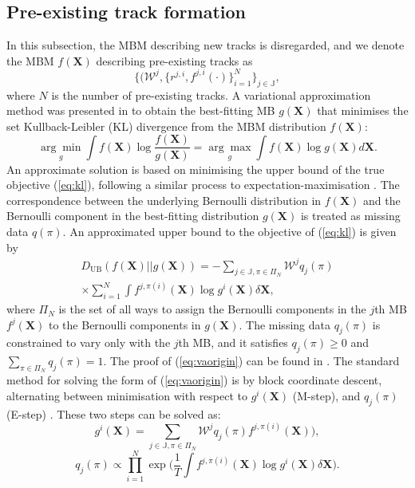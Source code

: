 \documentclass[conference]{IEEEtran}
\begin{document}
\subsection{Pre-existing track formation}
In this subsection, the MBM describing new tracks is disregarded, and we denote the MBM $f(\mathbf{X})$ describing pre-existing tracks as
\begin{equation}
\{(\mathcal{W}^j,\{r^{j,i},f^{j,i}(\cdot)\}_{i=1}^N\}_{j\in\mathbb{J}},
\end{equation}
where $N$ is the number of pre-existing tracks. A variational approximation method was presented in \cite{variational} to obtain the best-fitting MB $g(\mathbf{X})$ that minimises the set Kullback-Leibler (KL) divergence from the MBM distribution $f(\mathbf{X})$:
\begin{equation}
\underset{g}{\arg\min}\int f(\mathbf{X})\log\frac{f(\mathbf{X})}{g(\mathbf{X})} = \underset{g}{\arg\max}\int f(\mathbf{X})\log g(\mathbf{X})d\mathbf{X}.
\label{eq:kl}
\end{equation}
An approximate solution is based on minimising the upper bound of the true objective (\ref{eq:kl}), following a similar process to expectation-maximisation \cite{em}. The correspondence between the underlying Bernoulli distribution in $f(\mathbf{X})$ and the Bernoulli component in the best-fitting distribution $g(\mathbf{X})$ is treated as missing data $q(\pi)$. An approximated upper bound to the objective of (\ref{eq:kl}) is given by
\begin{multline}
D_{\text{UB}}(f(\mathbf{X})||g(\mathbf{X}))= -\sum_{j\in\mathbb{J},\pi\in\Pi_N}\mathcal{W}^jq_j(\pi)\\\times\sum_{i=1}^N\int f^{j,\pi(i)}(\mathbf{X})\log g^{i}(\mathbf{X})\delta \mathbf{X},
\label{eq:vaorigin}
\end{multline}
where $\Pi_N$ is the set of all ways to assign the Bernoulli components in the $j$th MB $f^j(\mathbf{X})$ to the Bernoulli components in $g(\mathbf{X})$. The missing data $q_j(\pi)$ is constrained to vary only with the $j$th MB, and it satisfies $q_j(\pi)\geq0$ and  $\sum_{\pi\in\Pi_N} q_j(\pi) = 1$. The proof of (\ref{eq:vaorigin}) can be found in \cite{variational}. The standard method for solving the form of (\ref{eq:vaorigin}) is by block coordinate descent, alternating between minimisation with respect to $g^i(\mathbf{X})$ (M-step), and $q_j(\pi)$ (E-step) \cite{variational}. These two steps can be solved as:
\begin{equation}
    g^{i}(\mathbf{X}) = \sum_{j\in\mathbb{J},\pi\in\Pi_N}\mathcal{W}^jq_j(\pi)f^{j,\pi(i)}(\mathbf{X})),
    \label{eq:mstep}
\end{equation}
\begin{equation}
    q_j(\pi)\propto \prod_{i=1}^N\exp\bigg(\frac{
    1}{T}\int f^{j,\pi(i)}(\mathbf{X})\log g^{i}(\mathbf{X})\delta \mathbf{X}\bigg).
    \label{eq:estep}
\end{equation}
\end{document}
